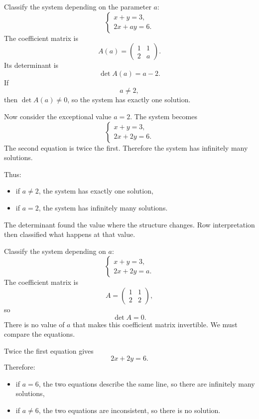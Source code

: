 \begin{examplebox}
Classify the system depending on the parameter \(a\):
\[
\begin{cases}
x+y=3,\\
2x+ay=6.
\end{cases}
\]
The coefficient matrix is
\[
A(a)=\begin{pmatrix}
1&1\\
2&a
\end{pmatrix}.
\]
Its determinant is
\[
\det A(a)=a-2.
\]
If
\[
a\ne2,
\]
then \(\det A(a)\ne0\), so the system has exactly one solution.

Now consider the exceptional value \(a=2\). The system becomes
\[
\begin{cases}
x+y=3,\\
2x+2y=6.
\end{cases}
\]
The second equation is twice the first. Therefore the system has infinitely many solutions.

Thus:
\begin{itemize}
\item if \(a\ne2\), the system has exactly one solution,
\item if \(a=2\), the system has infinitely many solutions.
\end{itemize}
\end{examplebox}

The determinant found the value where the structure changes. Row interpretation then classified what happens at that value.

\begin{examplebox}
Classify the system depending on \(a\):
\[
\begin{cases}
x+y=3,\\
2x+2y=a.
\end{cases}
\]
The coefficient matrix is
\[
A=\begin{pmatrix}
1&1\\
2&2
\end{pmatrix},
\]
so
\[
\det A=0.
\]
There is no value of \(a\) that makes this coefficient matrix invertible. We must compare the equations.

Twice the first equation gives
\[
2x+2y=6.
\]
Therefore:
\begin{itemize}
\item if \(a=6\), the two equations describe the same line, so there are infinitely many solutions,
\item if \(a\ne6\), the two equations are inconsistent, so there is no solution.
\end{itemize}
\end{examplebox}

